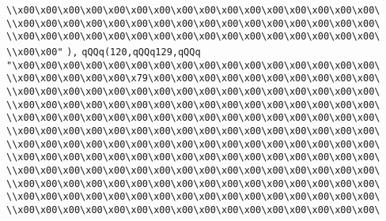 \verb|\\x00\x00\x00\x00\x00\x00\x00\x00\x00\x00\x00\x00\x00\x00\x00\x00\|\newline
\verb|\\x00\x00\x00\x00\x00\x00\x00\x00\x00\x00\x00\x00\x00\x00\x00\x00\|\newline
\verb|\\x00\x00\x00\x00\x00\x00\x00\x00\x00\x00\x00\x00\x00\x00\x00\x00\|\newline
\verb|\\x00\x00"|\newline
\verb|),|\newline
\verb|qQQq(120,qQQq129,qQQq|\newline
\verb|"\x00\x00\x00\x00\x00\x00\x00\x00\x00\x00\x00\x00\x00\x00\x00\x00\|\newline
\verb|\\x00\x00\x00\x00\x00\x79\x00\x00\x00\x00\x00\x00\x00\x00\x00\x00\|\newline
\verb|\\x00\x00\x00\x00\x00\x00\x00\x00\x00\x00\x00\x00\x00\x00\x00\x00\|\newline
\verb|\\x00\x00\x00\x00\x00\x00\x00\x00\x00\x00\x00\x00\x00\x00\x00\x00\|\newline
\verb|\\x00\x00\x00\x00\x00\x00\x00\x00\x00\x00\x00\x00\x00\x00\x00\x00\|\newline
\verb|\\x00\x00\x00\x00\x00\x00\x00\x00\x00\x00\x00\x00\x00\x00\x00\x00\|\newline
\verb|\\x00\x00\x00\x00\x00\x00\x00\x00\x00\x00\x00\x00\x00\x00\x00\x00\|\newline
\verb|\\x00\x00\x00\x00\x00\x00\x00\x00\x00\x00\x00\x00\x00\x00\x00\x00\|\newline
\verb|\\x00\x00\x00\x00\x00\x00\x00\x00\x00\x00\x00\x00\x00\x00\x00\x00\|\newline
\verb|\\x00\x00\x00\x00\x00\x00\x00\x00\x00\x00\x00\x00\x00\x00\x00\x00\|\newline
\verb|\\x00\x00\x00\x00\x00\x00\x00\x00\x00\x00\x00\x00\x00\x00\x00\x00\|\newline
\verb|\\x00\x00\x00\x00\x00\x00\x00\x00\x00\x00\x00\x00\x00\x00\x00\x00\|\newline
